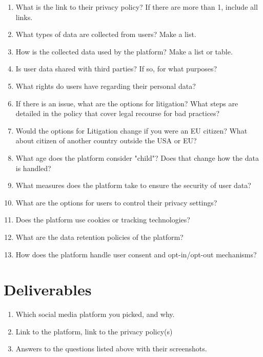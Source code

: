 \documentclass[12pt]{article}
\begin{document}
            \begin{enumerate}
                \item What is the link to their privacy policy? If there are more than 1, include all links.
                \item What types of data are collected from users?  Make a list.
                \item How is the collected data used by the platform?  Make a list or table.
                \item Is user data shared with third parties? If so, for what purposes?
                \item What rights do users have regarding their personal data?
                \item If there is an issue, what are the options for litigation? What steps are detailed in the policy that cover legal recourse for bad practices?
                \item Would the options for Litigation change if you were an EU citizen? What about citizen of another country outside the USA or EU?
                \item What age does the platform consider "child"? Does that change how the data is handled?
                \item What measures does the platform take to ensure the security of user data?
                \item What are the options for users to control their privacy settings?
                \item Does the platform use cookies or tracking technologies?
                \item What are the data retention policies of the platform?
                \item How does the platform handle user consent and opt-in/opt-out mechanisms?
        \end{enumerate}


\section*{Deliverables}

\begin{enumerate}
    \item Which social media platform you picked, and why.
    \item Link to the platform, link to the privacy policy(s)
    \item Answers to the questions listed above with their screenshots.

\end{enumerate}
\end{document}
